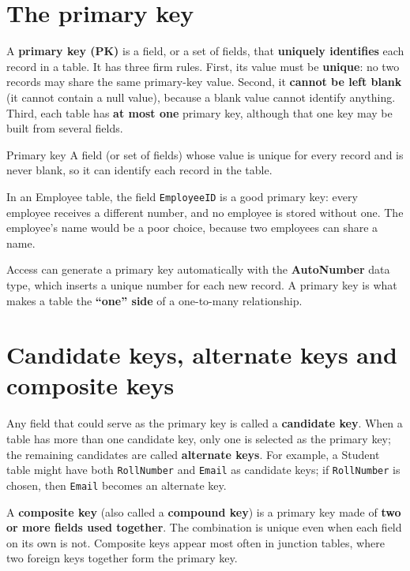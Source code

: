\section{The primary key}
A \textbf{primary key (PK)} is a field, or a set of fields, that
\textbf{uniquely identifies} each record in a table. It has three firm rules.
First, its value must be \textbf{unique}: no two records may share the same
primary-key value. Second, it \textbf{cannot be left blank} (it cannot contain
a null value), because a blank value cannot identify anything. Third, each
table has \textbf{at most one} primary key, although that one key may be built
from several fields.

\begin{definitionbox}{Primary key}
A field (or set of fields) whose value is unique for every record and is never
blank, so it can identify each record in the table.
\end{definitionbox}

\begin{example}
In an Employee table, the field \texttt{EmployeeID} is a good primary key: every
employee receives a different number, and no employee is stored without one.
The employee's name would be a poor choice, because two employees can share a
name.
\end{example}

Access can generate a primary key automatically with the \textbf{AutoNumber}
data type, which inserts a unique number for each new record. A primary key is
what makes a table the \textbf{``one'' side} of a one-to-many relationship.

\section{Candidate keys, alternate keys and composite keys}
Any field that could serve as the primary key is called a \textbf{candidate
key}. When a table has more than one candidate key, only one is selected as
the primary key; the remaining candidates are called \textbf{alternate keys}.
For example, a Student table might have both \texttt{RollNumber} and
\texttt{Email} as candidate keys; if \texttt{RollNumber} is chosen, then
\texttt{Email} becomes an alternate key.

A \textbf{composite key} (also called a \textbf{compound key}) is a primary key
made of \textbf{two or more fields used together}. The combination is unique
even when each field on its own is not. Composite keys appear most often in
junction tables, where two foreign keys together form the primary key.

